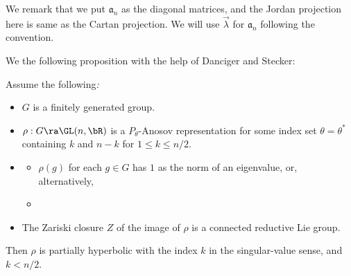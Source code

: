 We remark that we put $\mathfrak{a}_n$ as the diagonal matrices,   
and the Jordan projection here is same as the Cartan projection. 
We will use $\vec{\lambda}$ for $\mathfrak{a}_n$ following the convention.


We  the following proposition with the help of Danciger and Stecker: 
\begin{proposition}\label{prop:PAnosovStrict}  
Assume the following\/{\em :} 
\begin {itemize}
	\item  $G$ is a finitely generated group. %
	\item $\rho:G \ra \GL(n, \bR)$ is a
	$P_\theta$-Anosov representation 
	for some index set $\theta =\theta^*$ 
	containing $k$ and $n-k$ for 
	$1\leq k \leq n/2$.
	\item 
\begin{itemize} 
\item[(i)] $\rho(g)$ for each $g\in G$ has $1$ as the norm of an eigenvalue, 
or, alternatively, 
\item [(ii)]   
\end{itemize} 
	\item The Zariski closure $Z$ of the image of $\rho$ is 
	a connected reductive Lie group. 
\end{itemize} 
	Then $\rho$ is partially hyperbolic with the index $k$ in the singular-value sense, 
	and $k < n/2$.   
	\end{proposition}
